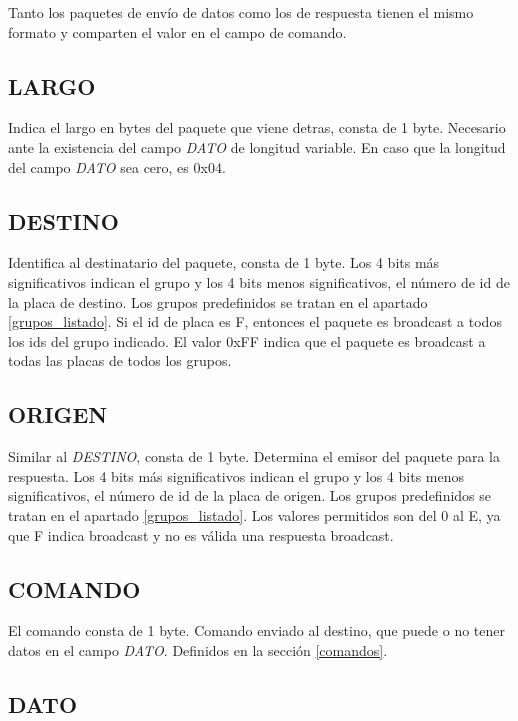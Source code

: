 \documentclass[a4paper,10pt]{article}
\begin{document}
Tanto los paquetes de env\'io de datos como los de respuesta tienen el mismo formato y comparten el valor en el campo de comando.

\subsection{LARGO}
\label{largo}

	Indica el largo en bytes del paquete que viene detras, consta de 1 byte.
	Necesario ante la existencia del campo \emph{DATO} de longitud variable.
	En caso que la longitud del campo \emph{DATO} sea cero, es 0x04.

\subsection{DESTINO}
\label{tipo_destinatario}

	Identifica al destinatario del paquete, consta de 1 byte.
	Los 4 bits m\'as significativos indican el grupo y los 4 bits menos significativos, el n\'umero de id de la placa de destino.
	Los grupos predefinidos se tratan en el apartado \ref{grupos_listado}.
	Si el id de placa es F, entonces el paquete es broadcast a todos los ids del grupo indicado.
	El valor 0xFF indica que el paquete es broadcast a todas las placas de todos los grupos.

\subsection{ORIGEN}
\label{tipo_emisor}

	Similar al \emph{DESTINO}, consta de 1 byte.
	Determina el emisor del paquete para la respuesta.
	Los 4 bits m\'as significativos indican el grupo y los 4 bits menos significativos, el n\'umero de id de la placa de origen.
	Los grupos predefinidos se tratan en el apartado \ref{grupos_listado}.
	Los valores permitidos son del 0 al E, ya que F indica broadcast y no es v\'alida una respuesta broadcast.

\subsection{COMANDO}
\label{comando}

	El comando consta de 1 byte.
	Comando enviado al destino, que puede o no tener datos en el campo \emph{DATO}.
	Definidos en la secci\'on \ref{comandos}.


\subsection{DATO}
\label{dato}
\end{document}
